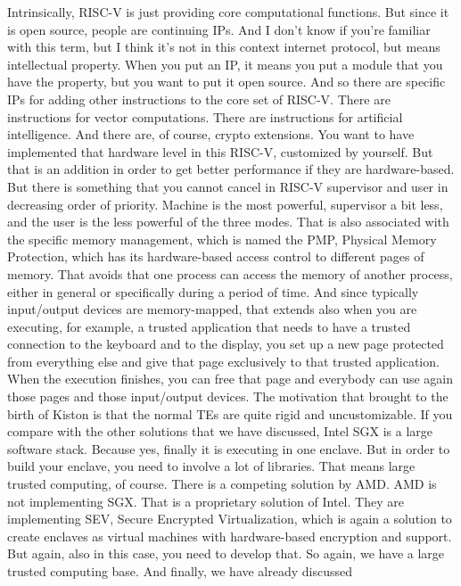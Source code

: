  Intrinsically, RISC-V is just providing core computational functions. But
 since it is open source, people are continuing IPs. And I don't know if you're
 familiar with this term, but I think it's not in this context internet
 protocol, but means intellectual property. When you put an IP, it means you
 put a module that you have the property, but you want to put it open source.
 And so there are specific IPs for adding other instructions to the core set of
 RISC-V. There are instructions for vector computations. There are instructions
 for artificial intelligence. And there are, of course, crypto extensions. You
 want to have implemented that hardware level in this RISC-V, customized by
 yourself. But that is an addition in order to get better performance if they
 are hardware-based. But there is something that you cannot cancel in RISC-V
 supervisor and user in decreasing order of priority. Machine is the most
 powerful, supervisor a bit less, and the user is the less powerful of the
 three modes. That is also associated with the specific memory management,
 which is named the PMP, Physical Memory Protection, which has its
 hardware-based access control to different pages of memory. That avoids that
 one process can access the memory of another process, either in general or
 specifically during a period of time. And since typically input/output devices
 are memory-mapped, that extends also when you are executing, for example, a
 trusted application that needs to have a trusted connection to the keyboard
 and to the display, you set up a new page protected from everything else and
 give that page exclusively to that trusted application. When the execution
 finishes, you can free that page and everybody can use again those pages and
 those input/output devices. The motivation that brought to the birth of Kiston
 is that the normal TEs are quite rigid and uncustomizable. If you compare with
 the other solutions that we have discussed, Intel SGX is a large software
 stack. Because yes, finally it is executing in one enclave. But in order to
 build your enclave, you need to involve a lot of libraries. That means large
 trusted computing, of course. There is a competing solution by AMD. AMD is not
 implementing SGX. That is a proprietary solution of Intel. They are
 implementing SEV, Secure Encrypted Virtualization, which is again a solution
 to create enclaves as virtual machines with hardware-based encryption and
 support. But again, also in this case, you need to develop that. So again, we
 have a large trusted computing base. And finally, we have already discussed
